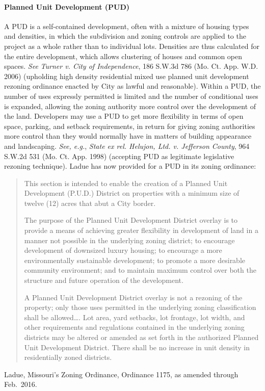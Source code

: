 \paragraph{Planned Unit Development (PUD)} A PUD is a self-contained
development, often with a mixture of housing types and densities, in which the
subdivision and zoning controls are applied to the project as a whole rather
than to individual lots. Densities are thus calculated for the entire
development, which allows clustering of houses and common open spaces.
\textit{See} \emph{Turner v. City of Independence}, 186 S.W.3d 786 (Mo. Ct. App.
W.D. 2006) (upholding high density residential mixed use planned unit
development rezoning ordinance enacted by City as lawful and reasonable). Within
a PUD, the number of uses expressly permitted is limited and the number of
conditional uses is expanded, allowing the zoning authority more control over
the development of the land. Developers may use a PUD to get more flexibility in
terms of open space, parking, and setback requirements, in return for giving
zoning authorities more control than they would normally have in matters of
building appearance and landscaping. \textit{See, e.g.}, \emph{State ex rel.
Helujon, Ltd. v. Jefferson County}, 964 S.W.2d 531 (Mo. Ct. App. 1998)
(accepting PUD as legitimate legislative rezoning technique).
Ladue has now provided for a PUD in its zoning ordinance:
\begin{quotation}
This section is intended to enable the creation of a Planned Unit Development
(P.U.D.) District on properties with a minimum size of twelve (12) acres that
abut a City border.

The purpose of the Planned Unit Development District overlay is to provide a
means of achieving greater flexibility in development of land in a manner not
possible in the underlying zoning district; to encourage development of
downsized luxury housing; to encourage a more environmentally sustainable
development; to promote a more desirable community environment; and to maintain
maximum control over both the structure and future operation of the development.

A Planned Unit Development District overlay is not a rezoning of the property;
only those uses permitted in the underlying zoning classification shall be
allowed\ldots. Lot area, yard setbacks, lot frontage, lot width, and other
requirements and regulations contained in the underlying zoning districts may be
altered or amended as set forth in the authorized Planned Unit Development
District. There shall be no increase in unit density in residentially zoned
districts.
\end{quotation}
Ladue, Missouri's Zoning Ordinance, Ordinance 1175, as amended through
Feb.~2016.

